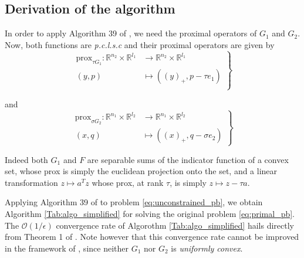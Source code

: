\documentclass{article} %
\begin{document}

\subsection{Derivation of the algorithm}
In order to apply Algorithm 39 of \cite{chambolle2010}, we need the proximal operators of
$G_1$ and $G_2$. Now, both functions are \textit{p.c.l.s.c} and their proximal operators are given by
  \begin{equation}
    \left .
    \begin{split}
      \text{prox}_{\tau G_1} : \mathbb{R}^{n_2} \times \mathbb{R}^{l_1} &\rightarrow \mathbb{R}^{n_2} \times \mathbb{R}^{l_1}\\
      (y, p) &\mapsto ((y)_+, p - \tau e_1)\\
    \end{split}
    \right\}
  \end{equation}

  and
  \begin{equation}
    \left .
    \begin{split}
      \text{prox}_{\sigma G_2}: \mathbb{R}^{n_1} \times \mathbb{R}^{l_2} &\rightarrow \mathbb{R}^{n_1} \times \mathbb{R}^{l_2}\\
      (x, q) &\mapsto ((x)_+, q - \sigma e_2)
    \end{split}
    \right\}
  \end{equation}

Indeed both $G_1$ and $F$ are separable sums of the indicator function of a convex set, whose prox is simply the euclidean projection onto the set,  and a linear transformation $z \mapsto a^Tz$ whose prox, at rank $\tau$, is simply $z \mapsto z - \tau a$.

Applying Algorithm 39 of \cite{chambolle2010} to problem \eqref{eq:unconstrained_pb}, we obtain Algorithm \ref{Tab:algo_simplified} for solving the original problem \eqref{eq:primal_pb}. The $\mathcal{O}(1/\epsilon)$ convergence rate of Algorothm \ref{Tab:algo_simplified} hails directly from Theorem 1 of \cite{chambolle2010}. Note however that this convergence rate cannot be improved in the framework of \cite{chambolle2010}, since neither $G_1$ nor $G_2$ is \textit{uniformly convex}.


\end{document}
